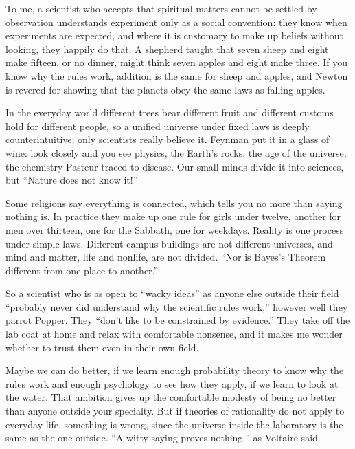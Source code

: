 To me, a scientist who accepts that spiritual matters cannot be settled by observation understands experiment only as a social convention: they know when experiments are expected, and where it is customary to make up beliefs without looking, they happily do that. A shepherd taught that seven sheep and eight make fifteen, or no dinner, might think seven apples and eight make three. If you know why the rules work, addition is the same for sheep and apples, and Newton is revered for showing that the planets obey the same laws as falling apples.

In the everyday world different trees bear different fruit and different customs hold for different people, so a unified universe under fixed laws is deeply counterintuitive; only scientists really believe it. Feynman put it in a glass of wine: look closely and you see physics, the Earth's rocks, the age of the universe, the chemistry Pasteur traced to disease. Our small minds divide it into sciences, but ``Nature does not know it!''

Some religions say everything is connected, which tells you no more than saying nothing is. In practice they make up one rule for girls under twelve, another for men over thirteen, one for the Sabbath, one for weekdays. Reality is one process under simple laws. Different campus buildings are not different universes, and mind and matter, life and nonlife, are not divided. ``Nor is Bayes's Theorem different from one place to another.''

So a scientist who is as open to ``wacky ideas'' as anyone else outside their field ``probably never did understand why the scientific rules work,'' however well they parrot Popper. They ``don't like to be constrained by evidence.'' They take off the lab coat at home and relax with comfortable nonsense, and it makes me wonder whether to trust them even in their own field. 

Maybe we can do better, if we learn enough probability theory to know why the rules work and enough psychology to see how they apply, if we learn to look at the water. That ambition gives up the comfortable modesty of being no better than anyone outside your specialty. But if theories of rationality do not apply to everyday life, something is wrong, since the universe inside the laboratory is the same as the one outside. ``A witty saying proves nothing,'' as Voltaire said.
